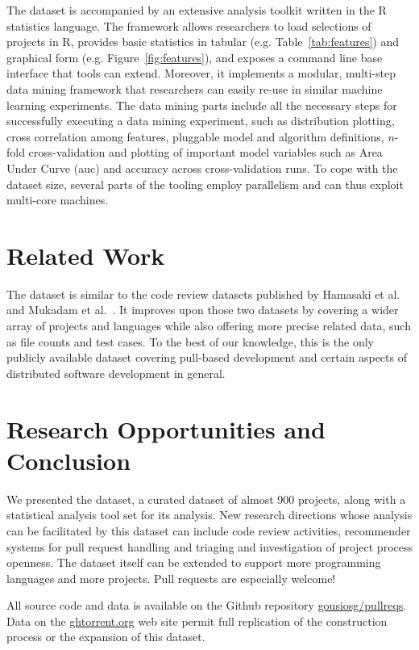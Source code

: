 \documentclass{sig-alternate}
\begin{document}
The \pullreqs dataset is accompanied by an extensive analysis toolkit written in
the R statistics language. The framework allows researchers to load selections
of projects in R, provides basic statistics in tabular (e.g.
Table~\ref{tab:features}) and graphical form (e.g. Figure~\ref{fig:features}),
and exposes a command line base interface that tools can extend. Moreover,
it implements a modular, multi-step data mining framework that researchers
can easily re-use in similar machine learning experiments. The data mining
parts include all the necessary steps for successfully executing a data mining
experiment, such as distribution plotting, cross correlation among features,
pluggable model and algorithm definitions, $n$-fold cross-validation and
plotting of important model variables such as Area Under Curve ({\sc auc}) and
accuracy across cross-validation runs. To cope with the \pullreqs dataset
size, several parts of the tooling employ parallelism and can thus exploit
multi-core machines.

\section{Related Work}
\label{sec:rel}

The \pullreqs dataset is similar to the code review datasets published by
Hamasaki et al.~\cite{Hamas13} and Mukadam et al.~\cite{Mukad13}.  It improves
upon those two datasets by covering a wider array of projects and languages
while also offering more precise related data, such as file counts and test
cases. To the best of our knowledge, this is the only publicly available
dataset covering pull-based development and certain aspects of distributed
software development in general.

\section{Research Opportunities and Conclusion}

We presented the \pullreqs dataset, a curated dataset of almost 900 projects,
along with a statistical analysis tool set for its analysis. New research directions whose analysis can be facilitated
by this dataset can include code review activities, recommender systems for pull
request handling and triaging and investigation of project process openness. The
dataset itself can be extended to support more programming languages and more
projects. Pull requests are especially welcome!

All source code and data is available on the Github repository
\href{https://github.com/gousiosg/pullreqs}{gousiosg/pullreqs}. Data on the
\href{http://ghtorrent.org}{ghtorrent.org} web site permit full replication
of the construction process or the expansion of this dataset.


\balance

  
\end{document}
